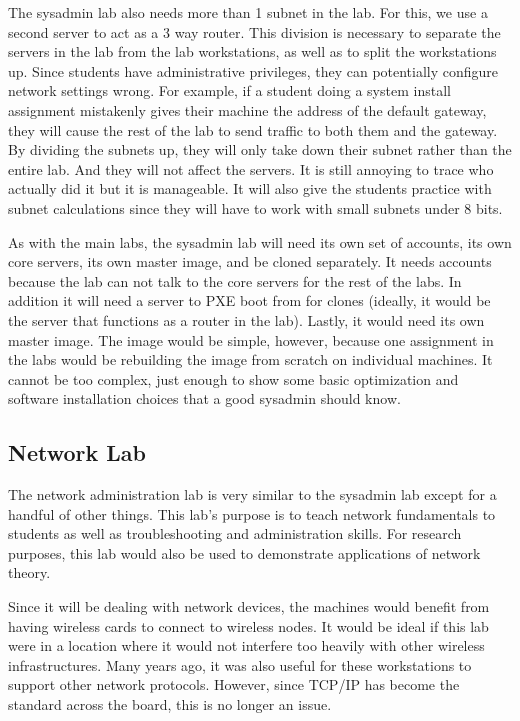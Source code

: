 The sysadmin lab also needs more than 1 subnet in the lab.  For this, we use a second server to act as a 3 way router.  This division is necessary to separate the servers in the lab from the lab workstations, as well as to split the workstations up.  Since students have administrative privileges, they can potentially configure network settings wrong.  For example, if a student doing a system install assignment mistakenly gives their machine the address of the default gateway, they will cause the rest of the lab to send traffic to both them and the gateway.  By dividing the subnets up, they will only take down their subnet rather than the entire lab.  And they will not affect the servers.  It is still annoying to trace who actually did it but it is manageable.  It will also give the students practice with subnet calculations since they will have to work with small subnets under 8 bits.

As with the main labs, the sysadmin lab will need its own set of accounts, its own core servers, its own master image, and be cloned separately.  It needs accounts because the lab can not talk to the core servers for the rest of the labs.  In addition it will need a server to PXE boot from for clones (ideally, it would be the server that functions as a router in the lab).  Lastly, it would need its own master image.  The image would be simple, however, because one assignment in the labs would be rebuilding the image from scratch on individual machines.  It cannot be too complex, just enough to show some basic optimization and software installation choices that a good sysadmin should know.  
\subsection{Network Lab}
The network administration lab is very similar to the sysadmin lab except for a handful of other things.  This lab's purpose is to teach network fundamentals to students as well as troubleshooting and administration skills.  For research purposes, this lab would also be used to demonstrate applications of network theory.  

Since it will be dealing with network devices, the machines would benefit from having wireless cards to connect to wireless nodes.  It would be ideal if this lab were in a location where it would not interfere too heavily with other wireless infrastructures.  Many years ago, it was also useful for these workstations to support other network protocols.  However, since TCP/IP has become the standard across the board, this is no longer an issue.  


